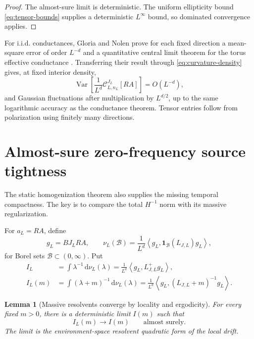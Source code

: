 \documentclass[11pt]{article}
\newtheorem{lemma}[theorem]{Lemma}
\theoremstyle{definition}
\theoremstyle{remark}
\newcommand{\cC}{\mathcal C}
\newcommand{\Var}{\operatorname{Var}}
\newcommand{\ip}[2]{\left\langle #1,#2\right\rangle}
\newcommand{\dd}{\,\mathrm d}
\begin{document}
\begin{proof}
The almost-sure limit is deterministic.  The uniform ellipticity bound \eqref{eq:tensor-bounds} supplies a deterministic $L^\infty$ bound, so dominated convergence applies.
\end{proof}

For i.i.d. conductances, Gloria and Nolen prove for each fixed direction a mean-square error of order $L^{-d}$ and a quantitative central limit theorem for the torus effective conductance \cite{GloriaNolen2016}.  Transferring their result through \eqref{eq:curvature-density} gives, at fixed interior density,
\begin{equation}
 \Var\left[\frac1{L^d}\cC_{L,n_L}^{J_L}[RA]\right]
 =O(L^{-d}),
 \label{eq:qgn-var}
\end{equation}
and Gaussian fluctuations after multiplication by $L^{d/2}$, up to the same logarithmic accuracy as the conductance theorem.  Tensor entries follow from polarization using finitely many directions.

\section{Almost-sure zero-frequency source tightness}
\label{sec:ergodic-source}

The static homogenization theorem also supplies the missing temporal compactness.  The key is to compare the total $H^{-1}$ norm with its massive regularization.

For $a_L=RA$, define
\begin{equation}
 g_L=BJ_LRA,
 \qquad
 \nu_L(\mathcal B)=\frac1{L^d}\ip{g_L}{\bm{1}_{\mathcal B}(L_{J,L})g_L},
 \label{eq:finite-spectral-measure}
\end{equation}
for Borel sets $\mathcal B\subset(0,\infty)$.  Put
\begin{align}
 I_L&=\int\lambda^{-1}\dd\nu_L(\lambda)
 =\frac1{L^d}\ip{g_L}{L_{J,L}^+g_L},
 \label{eq:I-total}\\
 I_L(m)&=\int(\lambda+m)^{-1}\dd\nu_L(\lambda)
 =\frac1{L^d}\ip{g_L}{(L_{J,L}+m)^{-1}g_L}.
 \label{eq:I-massive}
\end{align}

\begin{lemma}[Massive resolvents converge by locality and ergodicity]
\label{lem:massive-convergence}
For every fixed $m>0$, there is a deterministic limit $I(m)$ such that
\begin{equation}
 I_L(m)\longrightarrow I(m)
 \qquad\text{almost surely.}
 \label{eq:massive-limit}
\end{equation}
The limit is the environment-space resolvent quadratic form of the local drift.
\end{lemma}
\end{document}
